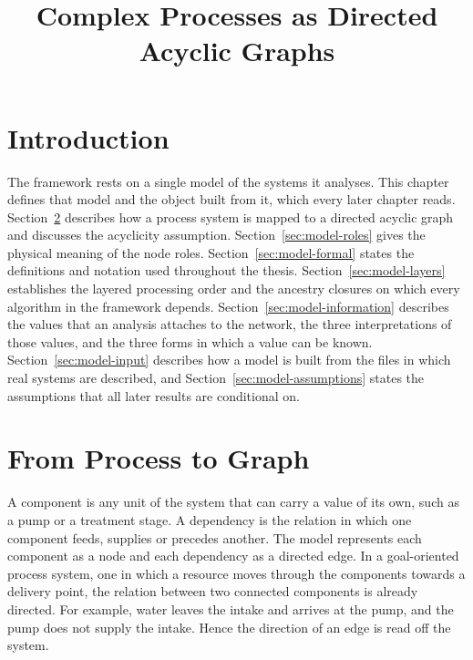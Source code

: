 \documentclass[12pt]{report}
\begin{document}
\title{Complex Processes as Directed Acyclic Graphs}
\fi

\section{Introduction}
\label{sec:model-intro}

The framework rests on a single model of the systems it analyses. This chapter defines that
model and the object built from it, which every later chapter reads. Section~\ref{sec:model-mapping}
describes how a process system is mapped to a directed acyclic graph and discusses the
acyclicity assumption. Section~\ref{sec:model-roles} gives the physical meaning of the node roles.
Section~\ref{sec:model-formal} states the definitions and notation used throughout the
thesis. Section~\ref{sec:model-layers} establishes the layered processing order and the
ancestry closures on which every algorithm in the framework depends.
Section~\ref{sec:model-information} describes the values that an analysis attaches to the
network, the three interpretations of those values, and the three forms in which a value can be
known. Section~\ref{sec:model-input} describes how a model is built from the files in which
real systems are described, and Section~\ref{sec:model-assumptions} states the assumptions
that all later results are conditional on.

\section{From Process to Graph}
\label{sec:model-mapping}

A component is any unit of the system that can carry a value of its own, such as a pump or
a treatment stage. A dependency is the relation in which one component
feeds, supplies or precedes another. The model represents each component as a node and each
dependency as a directed edge. In a goal-oriented process system, one in which a resource moves through the components
towards a delivery point, the relation between
two connected components is already directed. For example, water leaves the intake and arrives
at the pump, and the pump does not supply the intake. Hence the direction of an edge is read off the system.
\end{document}
